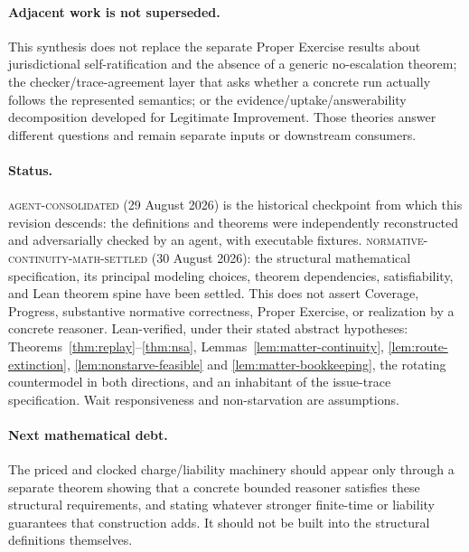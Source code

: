 \documentclass[11pt]{article}
\theoremstyle{definition}
\theoremstyle{remark}
\begin{document}
\paragraph{Adjacent work is not superseded.}
This synthesis does not replace the separate Proper Exercise results about
jurisdictional self-ratification and the absence of a generic no-escalation
theorem; the checker/trace-agreement layer that asks whether a concrete run
actually follows the represented semantics; or the evidence/uptake/answerability
decomposition developed for Legitimate Improvement. Those theories answer
different questions and remain separate inputs or downstream consumers.

\paragraph{Status.}
\textsc{agent-consolidated} (29 August 2026) is the historical checkpoint from
which this revision descends: the definitions and theorems were independently
reconstructed and adversarially checked by an agent, with executable fixtures.
\textsc{normative-continuity-math-settled} (30 August 2026): the structural
mathematical specification, its principal modeling choices, theorem
dependencies, satisfiability, and Lean theorem spine have been settled. This
does not assert Coverage, Progress, substantive normative correctness, Proper
Exercise, or realization by a concrete reasoner. Lean-verified, under their
stated abstract hypotheses: Theorems~\ref{thm:replay}--\ref{thm:nsa},
Lemmas~\ref{lem:matter-continuity}, \ref{lem:route-extinction},
\ref{lem:nonstarve-feasible} and \ref{lem:matter-bookkeeping}, the rotating
countermodel in both directions, and an inhabitant of the issue-trace
specification. Wait responsiveness and non-starvation are assumptions.

\paragraph{Next mathematical debt.}
The priced and clocked charge/liability machinery should appear only through a
separate theorem showing that a concrete bounded reasoner satisfies these
structural requirements, and stating whatever stronger finite-time or
liability guarantees that construction adds. It should not be built into the
structural definitions themselves.
\end{document}
